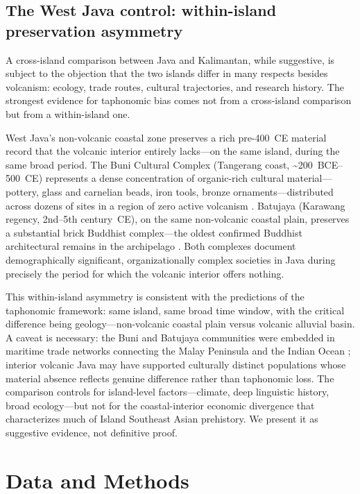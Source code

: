 \documentclass[12pt,a4paper]{article}
\begin{document}
\subsection{The West Java control: within-island preservation asymmetry}

A cross-island comparison between Java and Kalimantan, while suggestive, is subject to the objection that the two islands differ in many respects besides volcanism: ecology, trade routes, cultural trajectories, and research history. The strongest evidence for taphonomic bias comes not from a cross-island comparison but from a within-island one.

West Java's non-volcanic coastal zone preserves a rich pre-400~CE material record that the volcanic interior entirely lacks---on the same island, during the same broad period. The Buni Cultural Complex (Tangerang coast, \textasciitilde200~BCE--500~CE) represents a dense concentration of organic-rich cultural material---pottery, glass and carnelian beads, iron tools, bronze ornaments---distributed across dozens of sites in a region of zero active volcanism \citep{wibisono1994,bellina2014}. Batujaya (Karawang regency, 2nd--5th century~CE), on the same non-volcanic coastal plain, preserves a substantial brick Buddhist complex---the oldest confirmed Buddhist architectural remains in the archipelago \citep{manguin2011}. Both complexes document demographically significant, organizationally complex societies in Java during precisely the period for which the volcanic interior offers nothing.

This within-island asymmetry is consistent with the predictions of the taphonomic framework: same island, same broad time window, with the critical difference being geology---non-volcanic coastal plain versus volcanic alluvial basin. A caveat is necessary: the Buni and Batujaya communities were embedded in maritime trade networks connecting the Malay Peninsula and the Indian Ocean \citep{bellina2014,manguin2011}; interior volcanic Java may have supported culturally distinct populations whose material absence reflects genuine difference rather than taphonomic loss. The comparison controls for island-level factors---climate, deep linguistic history, broad ecology---but not for the coastal-interior economic divergence that characterizes much of Island Southeast Asian prehistory. We present it as suggestive evidence, not definitive proof.


\section{Data and Methods}
\end{document}
